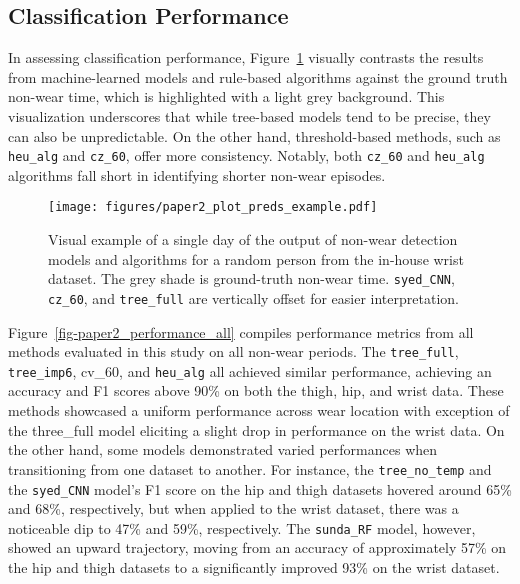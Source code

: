 \documentclass[
  10pt,
]{scrbook}
\begin{document}
\hypertarget{classification-performance}{%
\subsection{Classification
Performance}\label{classification-performance}}

In assessing classification performance,
Figure~\ref{fig-paper2_preds_ex} visually contrasts the results from
machine-learned models and rule-based algorithms against the ground
truth non-wear time, which is highlighted with a light grey background.
This visualization underscores that while tree-based models tend to be
precise, they can also be unpredictable. On the other hand,
threshold-based methods, such as \texttt{heu\_alg} and \texttt{cz\_60},
offer more consistency. Notably, both \texttt{cz\_60} and
\texttt{heu\_alg} algorithms fall short in identifying shorter non-wear
episodes.

\begin{figure}

{\centering \texttt{[image: figures/paper2\_plot\_preds\_example.pdf]}

}

\caption{\label{fig-paper2_preds_ex}Visual example of a single day of
the output of non-wear detection models and algorithms for a random
person from the in-house wrist dataset. The grey shade is ground-truth
non-wear time. \texttt{syed\_CNN}, \texttt{cz\_60}, and
\texttt{tree\_full} are vertically offset for easier interpretation.}

\end{figure}

Figure~\ref{fig-paper2_performance_all} compiles performance metrics
from all methods evaluated in this study on all non-wear periods. The
\texttt{tree\_full}, \texttt{tree\_imp6}, cv\_60, and \texttt{heu\_alg}
all achieved similar performance, achieving an accuracy and F1 scores
above 90\% on both the thigh, hip, and wrist data. These methods
showcased a uniform performance across wear location with exception of
the three\_full model eliciting a slight drop in performance on the
wrist data. On the other hand, some models demonstrated varied
performances when transitioning from one dataset to another. For
instance, the \texttt{tree\_no\_temp} and the \texttt{syed\_CNN} model's
F1 score on the hip and thigh datasets hovered around 65\% and 68\%,
respectively, but when applied to the wrist dataset, there was a
noticeable dip to 47\% and 59\%, respectively. The \texttt{sunda\_RF}
model, however, showed an upward trajectory, moving from an accuracy of
approximately 57\% on the hip and thigh datasets to a significantly
improved 93\% on the wrist dataset.
\end{document}
